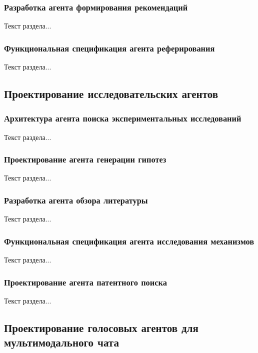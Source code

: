 \subsubsection{Разработка агента формирования рекомендаций}

Текст раздела...

\subsubsection{Функциональная спецификация агента реферирования}

Текст раздела...

\subsection{Проектирование исследовательских агентов}

\subsubsection{Архитектура агента поиска экспериментальных исследований}

Текст раздела...

\subsubsection{Проектирование агента генерации гипотез}

Текст раздела...

\subsubsection{Разработка агента обзора литературы}

Текст раздела...

\subsubsection{Функциональная спецификация агента исследования механизмов}

Текст раздела...

\subsubsection{Проектирование агента патентного поиска}

Текст раздела...

\subsection{Проектирование голосовых агентов для мультимодального чата}


